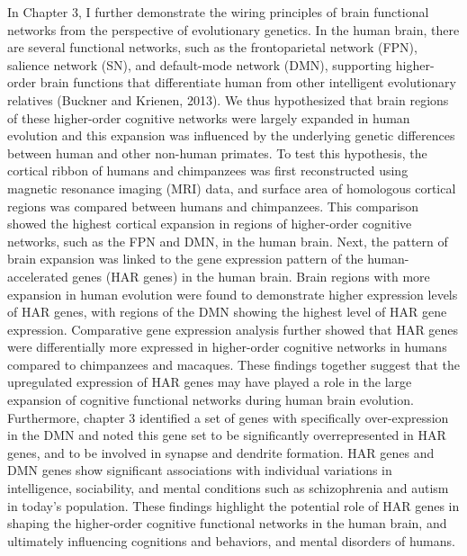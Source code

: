 \begin{refsection}
In Chapter 3, I further demonstrate the wiring principles of brain functional networks from the perspective of evolutionary genetics. In the human brain, there are several functional networks, such as the frontoparietal network (FPN), salience network (SN), and default-mode network (DMN), supporting higher-order brain functions that differentiate human from other intelligent evolutionary relatives (Buckner and Krienen, 2013). We thus hypothesized that brain regions of these higher-order cognitive networks were largely expanded in human evolution and this expansion was influenced by the underlying genetic differences between human and other non-human primates. To test this hypothesis, the cortical ribbon of humans and chimpanzees was first reconstructed using magnetic resonance imaging (MRI) data, and surface area of homologous cortical regions was compared between humans and chimpanzees. This comparison showed the highest cortical expansion in regions of higher-order cognitive networks, such as the FPN and DMN, in the human brain. Next, the pattern of brain expansion was linked to the gene expression pattern of the human-accelerated genes (HAR genes) in the human brain. Brain regions with more expansion in human evolution were found to demonstrate higher expression levels of HAR genes, with regions of the DMN showing the highest level of HAR gene expression. Comparative gene expression analysis further showed that HAR genes were differentially more expressed in higher-order cognitive networks in humans compared to chimpanzees and macaques. These findings together suggest that the upregulated expression of HAR genes may have played a role in the large expansion of cognitive functional networks during human brain evolution. Furthermore, chapter 3 identified a set of genes with specifically over-expression in the DMN and noted this gene set to be significantly overrepresented in HAR genes, and to be involved in synapse and dendrite formation. HAR genes and DMN genes show significant associations with individual variations in intelligence, sociability, and mental conditions such as schizophrenia and autism in today’s population. These findings highlight the potential role of HAR genes in shaping the higher-order cognitive functional networks in the human brain, and ultimately influencing cognitions and behaviors, and mental disorders of humans.


\end{refsection}
